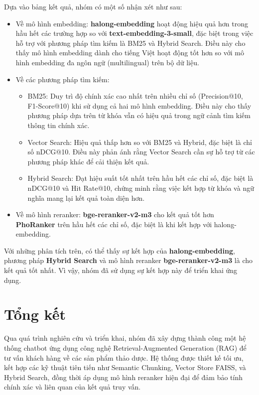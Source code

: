 \documentclass{article}
\numberwithin{equation}{section}
\numberwithin{equation}{section}
\begin{document}
Dựa vào bảng kết quả, nhóm có một số nhận xét như sau: 
\begin{itemize}
    \item Về mô hình embedding: \textbf{halong-embedding} hoạt động hiệu quả hơn trong hầu hết các trường hợp so với \textbf{text-embedding-3-small}, đặc biệt trong việc hỗ trợ với phương pháp tìm kiếm là BM25 và Hybrid Search. Điều này cho thấy mô hình embedding dành cho tiếng Việt hoạt động tốt hơn so với mô hình embedding đa ngôn ngữ (multilingual) trên bộ dữ liệu.
    \item Về các phương pháp tìm kiếm:
    \begin{itemize}
        \item BM25: Duy trì độ chính xác cao nhất trên nhiều chỉ số (Precision@10, F1-Score@10) khi sử dụng cả hai mô hình embedding. Điều này cho thấy phương pháp dựa trên từ khóa vẫn có hiệu quả trong ngữ cảnh tìm kiếm thông tin chính xác.
        \item Vector Search: Hiệu quả thấp hơn so với BM25 và Hybrid, đặc biệt là chỉ số nDCG@10. Điều này phản ánh rằng Vector Search cần sự hỗ trợ từ các phương pháp khác để cải thiện kết quả.
        \item Hybrid Search: Đạt hiệu suất tốt nhất trên hầu hết các chỉ số, đặc biệt là nDCG@10 và Hit Rate@10, chứng minh rằng việc kết hợp từ khóa và ngữ nghĩa mang lại kết quả toàn diện hơn.
    \end{itemize}
    \item Về mô hình reranker: \textbf{bge-reranker-v2-m3} cho kết quả tốt hơn \textbf{PhoRanker} trên hầu hết các chỉ số, đặc biệt là khi kết hợp với halong-embedding.
\end{itemize}

Với những phân tích trên, có thể thấy sự kết hợp của \textbf{halong-embedding}, phương pháp \textbf{Hybrid Search} và mô hình reranker \textbf{bge-reranker-v2-m3} là cho kết quả tốt nhất. Vì vậy, nhóm đã sử dụng sự kết hợp này để triển khai ứng dụng.

\section{\textbf{Tổng kết}}
Qua quá trình nghiên cứu và triển khai, nhóm đã xây dựng thành công một hệ thống chatbot ứng dụng công nghệ Retrieval-Augmented Generation (RAG) để tư vấn khách hàng về các sản phẩm thảo dược. Hệ thống được thiết kế tối ưu, kết hợp các kỹ thuật tiên tiến như Semantic Chunking, Vector Store FAISS, và Hybrid Search, đồng thời áp dụng mô hình reranker hiện đại để đảm bảo tính chính xác và liên quan của kết quả truy vấn.
\end{document}
